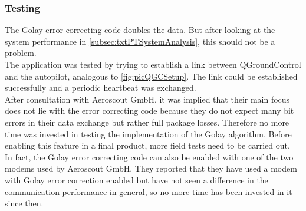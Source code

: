 \subsubsection{Testing}
The Golay error correcting code doubles the data. But after looking at the system performance in \autoref{subsec:txtPTSystemAnalysis}, this should not be a problem.\\
The application was tested by trying to establish a link between QGroundControl and the autopilot, analogous to \autoref{fig:picQGCSetup}. The link could be established successfully and a periodic heartbeat was exchanged.\\
After consultation with Aeroscout GmbH, it was implied that their main focus does not lie with the error correcting code because they do not expect many bit errors in their data exchange but rather full package losses. Therefore no more time was invested in testing the implementation of the Golay algorithm. Before enabling this feature in a final product, more field tests need to be carried out.\\
In fact, the Golay error correcting code can also be enabled with one of the two modems used by Aeroscout GmbH. They reported that they have used a modem with Golay error correction enabled but have not seen a difference in the communication performance in general, so no more time has been invested in it since then. 
%
%
%
%
